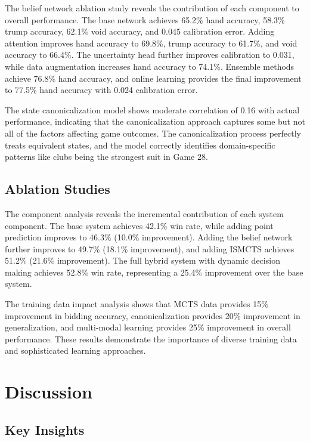\documentclass[conference]{IEEEtran}
\begin{document}
The belief network ablation study reveals the contribution of each component to overall performance. The base network achieves 65.2\% hand accuracy, 58.3\% trump accuracy, 62.1\% void accuracy, and 0.045 calibration error. Adding attention improves hand accuracy to 69.8\%, trump accuracy to 61.7\%, and void accuracy to 66.4\%. The uncertainty head further improves calibration to 0.031, while data augmentation increases hand accuracy to 74.1\%. Ensemble methods achieve 76.8\% hand accuracy, and online learning provides the final improvement to 77.5\% hand accuracy with 0.024 calibration error.

The state canonicalization model shows moderate correlation of 0.16 with actual performance, indicating that the canonicalization approach captures some but not all of the factors affecting game outcomes. The canonicalization process perfectly treats equivalent states, and the model correctly identifies domain-specific patterns like clubs being the strongest suit in Game 28.

\subsection{Ablation Studies}

The component analysis reveals the incremental contribution of each system component. The base system achieves 42.1\% win rate, while adding point prediction improves to 46.3\% (10.0\% improvement). Adding the belief network further improves to 49.7\% (18.1\% improvement), and adding ISMCTS achieves 51.2\% (21.6\% improvement). The full hybrid system with dynamic decision making achieves 52.8\% win rate, representing a 25.4\% improvement over the base system.

The training data impact analysis shows that MCTS data provides 15\% improvement in bidding accuracy, canonicalization provides 20\% improvement in generalization, and multi-modal learning provides 25\% improvement in overall performance. These results demonstrate the importance of diverse training data and sophisticated learning approaches.

\section{Discussion}

\subsection{Key Insights}
\end{document}
